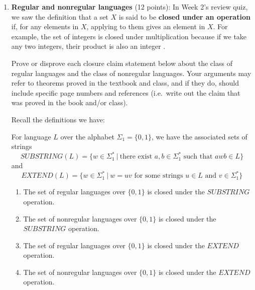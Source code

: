 \begin{enumerate}[wide, labelwidth=!, labelindent=0pt]
\begin{enumerate}
\item\gradeComplete In class and in the reading so far, we've seen the following examples of nonregular sets:
\begin{multicols}{3}
\begin{center}
$\{ 0^n 1^n ~|~ n \geq 0 \}$
$$\{ 0^n 1^n ~|~ n \geq 2 \}$$
$$\{ 0^n 1^m ~|~  0 \leq n \leq m \}$$
$$\{ 0^n 1^m ~|~ 0 \leq m \leq n \}$$
$$\{ 0^i 1^{2i} ~|~ 0 \leq i \}$$
$$\{ 0^i 1^{i+1} ~|~ 0 \leq i \}$$
$$\{ 0^n 1^m 0^n ~|~n,m \geq 0\}$$
$$\{ w \in \{0,1\}^* ~|~w = w^R\}$$
$$\{ w w^R ~|~ w \in \{0,1\}^*\}$$
\end{center}
\end{multicols}
Modify one of these sets in some way and use the Pumping Lemma to prove that the resulting set is still nonregular.

\end{enumerate}

\item\textbf{Regular and nonregular languages} (12 points):
In Week 2's review quiz, we saw the definition that a set $X$ is said to be 
{\bf closed under an operation} if, for any elements in
$X$, applying to them gives an element in $X$. For example, the set of
integers is closed under multiplication because if we take any two
integers, their product is also an integer .

Prove or disprove each closure claim statement below about the class of regular languages
and the class of nonregular languages.
Your arguments may refer to theorems proved in the textbook and class, and if they do, should 
include specific page numbers and references (i.e.\ write out the claim that was proved in the book 
and/or class).

Recall the definitions we have: 

For language $L$ over the alphabet $\Sigma_1 = \{0,1\}$, we have the 
associated sets of strings
\[
   SUBSTRING(L) = \{ w \in \Sigma_1^* ~|~ \text{there exist } a,b \in \Sigma_1^* \text{ such that } awb \in L\}
\]
and 
\[
  EXTEND(L) = \{ w \in \Sigma_1^* ~|~ w = uv \text{ for some strings } u \in L \text{ and } v \in \Sigma_1^* \}
\]
\begin{enumerate} 
   \item \gradeComplete The set of regular languages over $\{0,1\}$ is closed under the $SUBSTRING$ operation.

   \item \gradeComplete The set of nonregular languages over $\{0,1\}$ is closed under the $SUBSTRING$ operation.

   \item \gradeCorrect The set of regular languages over $\{0,1\}$ is closed under the $EXTEND$ operation.

   \item \gradeCorrect The set of nonregular languages over $\{0,1\}$ is closed under the $EXTEND$ operation.
\end{enumerate}

\end{enumerate}
\newpage

